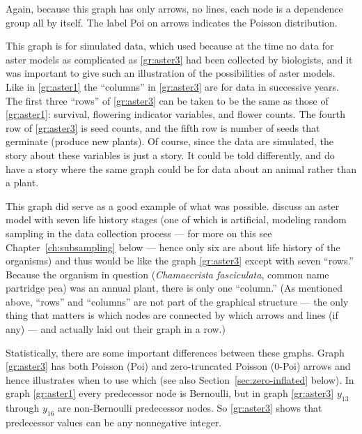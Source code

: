 Again, because this graph has only arrows, no lines, each node is
a dependence group all by itself.  The label Poi on arrows indicates
the Poisson distribution.

This graph is for simulated data, which \citet{aster3} used because
at the time no data for aster models as complicated as \eqref{gr:aster3} had
been collected by biologists, and it was important to give such
an illustration of the possibilities of aster models.
Like in \eqref{gr:aster1} the ``columns'' in \eqref{gr:aster3} are for
data in successive years.  The first three ``rows'' of \eqref{gr:aster3}
can be taken to be the same as those of \eqref{gr:aster1}: survival,
flowering indicator variables, and flower counts.  The fourth row of
\eqref{gr:aster3} is seed counts, and the fifth row is number of seeds
that germinate (produce new plants).  Of course, since the data
are simulated, the story about these variables is just a story.
It could be told differently, and \citet{aster3} do have a story
where the same graph could be for data about an animal rather than a plant.

This graph did serve as a good example of what was possible.
\citet*[in the on-line appendix]{stanton-geddes-tiffin-shaw}
discuss an aster model with seven life history stages (one of which is
artificial, modeling random sampling in the data collection process ---
for more on this see Chapter~\ref{ch:subsampling} below --- hence
only six are about life history of the organisms) and thus would be
like the graph \eqref{gr:aster3} except with seven ``rows.''
Because the organism in question (\emph{Chamaecrista fasciculata}, common
name partridge pea) was an annual plant, there is only one ``column.''
(As mentioned above, ``rows'' and ``columns'' are not part of the graphical
structure --- the only thing that matters is which nodes are connected
by which arrows and lines (if any) ---
and \citeauthor{stanton-geddes-tiffin-shaw} actually
laid out their graph in a row.)

Statistically, there are some important differences between these graphs.
Graph \eqref{gr:aster3} has both Poisson (Poi) and zero-truncated Poisson
(0-Poi) arrows and hence illustrates when to use which
(see also Section~\ref{sec:zero-inflated} below).
In graph \eqref{gr:aster1} every predecessor node is Bernoulli,
but in graph \eqref{gr:aster3} $y_{13}$ through $y_{16}$ are non-Bernoulli
predecessor nodes.  So \eqref{gr:aster3} shows that predecessor values can
be any nonnegative integer.

